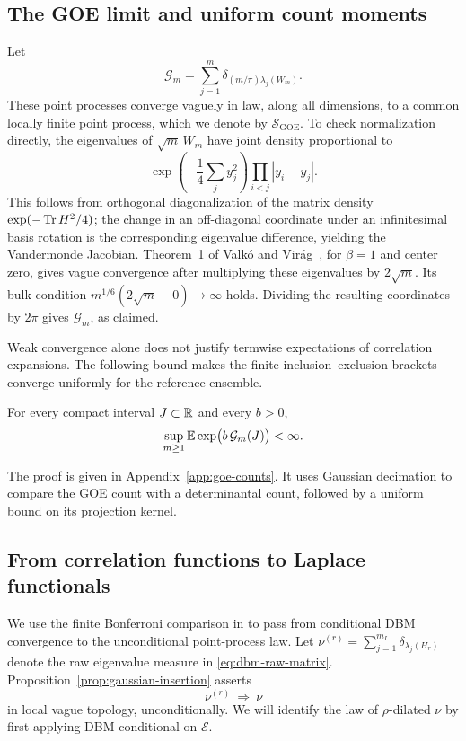 \subsection{The GOE limit and uniform count moments}

Let
\[
 \mathcal G_m=\sum_{j=1}^m
       \delta_{(m/\pi)\lambda_j(W_m)}.
\]
These point processes converge vaguely in law, along all dimensions,
to a common locally finite point process, which we denote by
\(\mathcal S_{\mathrm{GOE}}\). To check normalization directly,
the eigenvalues of \(\sqrt m\,W_m\) have joint density proportional to
\[
 \exp\left(-\frac14\sum_j y_j^2\right)
       \prod_{i<j}|y_i-y_j|.
\]
This follows from orthogonal diagonalization of the matrix density
\(\exp(-\operatorname{Tr} H^2/4)\); the change in an off-diagonal coordinate under
an infinitesimal basis rotation is the corresponding eigenvalue
difference, yielding the Vandermonde Jacobian.
Theorem~1 of Valk\'o and Vir\'ag~\cite{ValkoVirag2009}, for \(\beta=1\) and center zero,
gives vague convergence after multiplying these eigenvalues by
\(2\sqrt m\). Its bulk condition
\(m^{1/6}(2\sqrt m-0)\to\infty\) holds. Dividing the resulting
coordinates by \(2\pi\) gives \(\mathcal G_m\), as claimed.

Weak convergence alone does not justify termwise expectations of
correlation expansions. The following bound makes the finite inclusion--exclusion brackets
converge uniformly for the reference ensemble.

\begin{lemma}
\label{lem:goe-counts}
For every compact interval \(J\subset\mathbb R\) and every \(b>0\),
\[
 \sup_{m\ge1}\mathbb E\exp\bigl(b\,\mathcal G_m(J)\bigr)<\infty.
\]
\end{lemma}

The proof is given in Appendix~\ref{app:goe-counts}.  It uses Gaussian
decimation to compare the GOE count with a determinantal count, followed
by a uniform bound on its projection kernel.


\subsection{From correlation functions to Laplace functionals}

We use the finite Bonferroni comparison in \cite[Section~6.4]{bu}
to pass from conditional DBM convergence to the unconditional
point-process law.
Let \(\nu^{(r)}=\sum_{j=1}^{m_I}\delta_{\lambda_j(H_r)}\) denote
the raw eigenvalue measure in \eqref{eq:dbm-raw-matrix}.
Proposition~\ref{prop:gaussian-insertion} asserts
\begin{equation}
 \label{eq:dbm-insertion-limit}
 \nu^{(r)}\ \Longrightarrow\ \nu
\end{equation}
in local vague topology, unconditionally. We will identify the law
of \(\rho\)-dilated \(\nu\) by first applying DBM conditional on \(\mathcal E\).

